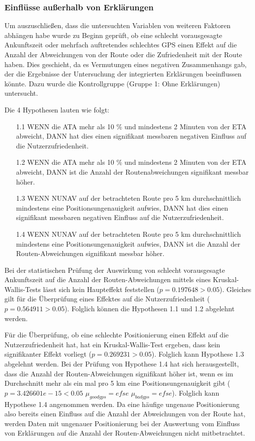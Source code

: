 \subsubsection{Einflüsse außerhalb von Erklärungen}

Um auszuschließen, dass die untersuchten Variablen von weiteren Faktoren abhängen habe wurde zu Beginn geprüft, ob eine schlecht vorausgesagte Ankunftszeit oder mehrfach auftretendes schlechtes GPS einen Effekt auf die Anzahl der Abweichungen von der Route oder die Zufriedenheit mit der Route haben. Dies geschieht, da es Vermutungen eines negativen Zusammenhangs gab, der die Ergebnisse der Untersuchung der integrierten Erklärungen beeinflussen könnte. Dazu wurde die Kontrollgruppe (Gruppe 1: Ohne Erklärungen) untersucht.

Die 4 Hypothesen lauten wie folgt:

\begin{enumerate}
    \item[1.1] WENN die ATA mehr als 10 \% und mindestens 2 Minuten von der ETA abweicht, DANN hat dies einen signifikant messbaren negativen Einfluss auf die Nutzerzufriedenheit.
    \item[1.2] WENN die ATA mehr als 10 \% und mindestens 2 Minuten von der ETA abweicht, DANN ist die Anzahl der Routenabweichungen signifikant messbar höher.
    \item[1.3] WENN NUNAV auf der betrachteten Route pro 5 km durchschnittlich mindestens eine Positionsungenauigkeit aufwies, DANN hat dies einen signifikant messbaren negativen Einfluss auf die Nutzerzufriedenheit.
    \item[1.4] WENN NUNAV auf der betrachteten Route pro 5 km durchschnittlich mindestens eine Positionsungenauigkeit aufwies, DANN ist die Anzahl der Routen-Abweichungen signifikant messbar höher.
\end{enumerate}

Bei der statistischen Prüfung der Auswirkung von schlecht vorausgesagte Ankunftszeit auf die Anzahl der Routen-Abweichungen mittels eines Kruskal-Wallis-Tests lässt sich kein Haupteffekt feststellen ($ p = 0.197648 > 0.05 $). Gleiches gilt für die Überprüfung eines Effektes auf die Nutzerzufriedenheit ($ p = 0.564911 > 0.05 $). Folglich können die Hypothesen 1.1 und 1.2 abgelehnt werden.

Für die Überprüfung, ob eine schlechte Positionierung einen Effekt auf die Nutzerzufriedenheit hat, hat ein Kruskal-Wallis-Test ergeben, dass kein signifikanter Effekt vorliegt ($ p = 0.269231 > 0.05 $). Folglich kann Hypothese 1.3 abgelehnt werden. Bei der Prüfung von Hypothese 1.4 hat sich herausgestellt, dass die Anzahl der Routen-Abweichungen signifikant höher ist, wenn es im Durchschnitt mehr als ein mal pro 5 km eine Positionsungenauigkeit gibt ($ p = 3.426601e-15 < 0.05 $  $ \mu_{good gps}=efse $ $ \mu_{bad gps}=efse $). Folglich kann Hypothese 1.4 angenommen werden. Da eine häufige ungenaue Positionierung also bereits einen Einfluss auf die Anzahl der Abweichungen von der Route hat, werden Daten mit ungenauer Positionierung bei der Auswertung vom Einfluss von Erklärungen auf die Anzahl der Routen-Abweichungen nicht mitbetrachtet.

